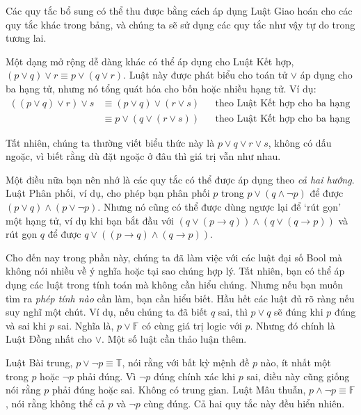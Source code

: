 Các quy tắc bổ sung có thể thu được bằng cách áp dụng Luật Giao hoán cho các quy tắc khác trong bảng, và chúng ta sẽ sử dụng các quy tắc như vậy tự do trong tương lai.

Một dạng mở rộng dễ dàng khác có thể áp dụng cho Luật Kết hợp, $(p \lor q) \lor r \equiv p \lor (q \lor r)$. Luật này được phát biểu cho toán tử $\lor$ áp dụng cho ba hạng tử, nhưng nó tổng quát hóa cho bốn hoặc nhiều hạng tử. Ví dụ:
\begin{align*}
((p \lor q) \lor r) \lor s &\equiv (p \lor q) \lor (r \lor s) && \text{theo Luật Kết hợp cho ba hạng tử} \\
&\equiv p \lor (q \lor (r \lor s)) && \text{theo Luật Kết hợp cho ba hạng tử}
\end{align*}

Tất nhiên, chúng ta thường viết biểu thức này là $p \lor q \lor r \lor s$, không có dấu ngoặc, vì biết rằng dù đặt ngoặc ở đâu thì giá trị vẫn như nhau.

\begin{notebox}
Một điều nữa bạn nên nhớ là các quy tắc có thể được áp dụng theo \emph{cả hai hướng}. Luật Phân phối, ví dụ, cho phép bạn phân phối $p$ trong $p \lor (q \land \lnot p)$ để được $(p \lor q) \land (p \lor \lnot p)$. Nhưng nó cũng có thể được dùng ngược lại để `rút gọn' một hạng tử, ví dụ khi bạn bắt đầu với $(q \lor (p \to q)) \land (q \lor (q \to p))$ và rút gọn $q$ để được $q \lor ((p \to q) \land (q \to p))$.
\end{notebox}

Cho đến nay trong phần này, chúng ta đã làm việc với các luật đại số Bool mà không nói nhiều về ý nghĩa hoặc tại sao chúng hợp lý. Tất nhiên, bạn có thể áp dụng các luật trong tính toán mà không cần hiểu chúng. Nhưng nếu bạn muốn tìm ra \emph{phép tính nào} cần làm, bạn cần hiểu biết. Hầu hết các luật đủ rõ ràng nếu suy nghĩ một chút. Ví dụ, nếu chúng ta đã biết $q$ sai, thì $p \lor q$ sẽ đúng khi $p$ đúng và sai khi $p$ sai. Nghĩa là, $p \lor \mathbb{F}$ có cùng giá trị logic với $p$. Nhưng đó chính là Luật Đồng nhất cho $\lor$. Một số luật cần thảo luận thêm.

Luật Bài trung, $p \lor \lnot p \equiv \mathbb{T}$, nói rằng với bất kỳ mệnh đề $p$ nào, ít nhất một trong $p$ hoặc $\lnot p$ phải đúng. Vì $\lnot p$ đúng chính xác khi $p$ sai, điều này cũng giống nói rằng $p$ phải đúng hoặc sai. Không có trung gian. Luật Mâu thuẫn, $p \land \lnot p \equiv \mathbb{F}$, nói rằng không thể cả $p$ và $\lnot p$ cùng đúng. Cả hai quy tắc này đều hiển nhiên.


